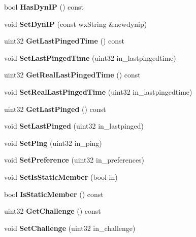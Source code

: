\begin{DoxyCompactItemize}
\item 
bool {\bfseries HasDynIP} () const \label{classCServer_a6b8d253822dd10ac34843a93030889fd}

\item 
void {\bfseries SetDynIP} (const wxString \&newdynip)\label{classCServer_ae05c6453354d0c1fec58bd96cefef867}

\item 
uint32 {\bfseries GetLastPingedTime} () const \label{classCServer_a6e4961fb0a54c8f3671c135997741e3a}

\item 
void {\bfseries SetLastPingedTime} (uint32 in\_\-lastpingedtime)\label{classCServer_a81ab8ff4d5c73e63e2db7dcf61e68a70}

\item 
uint32 {\bfseries GetRealLastPingedTime} () const \label{classCServer_aa6e37ebd66c70e1e1ca835c7ce4ab44c}

\item 
void {\bfseries SetRealLastPingedTime} (uint32 in\_\-lastpingedtime)\label{classCServer_a7f3e695424443a83d3325de6c2c43d2d}

\item 
uint32 {\bfseries GetLastPinged} () const \label{classCServer_aef4187e834eab2bc644dc161673003de}

\item 
void {\bfseries SetLastPinged} (uint32 in\_\-lastpinged)\label{classCServer_a545b36f98670081409b0e1178ed2f423}

\item 
void {\bfseries SetPing} (uint32 in\_\-ping)\label{classCServer_ac5214ccc8284d00eacae33cc45e43386}

\item 
void {\bfseries SetPreference} (uint32 in\_\-preferences)\label{classCServer_a2008d9552fe630bdcfe3fea0b6a0586d}

\item 
void {\bfseries SetIsStaticMember} (bool in)\label{classCServer_a09c7bdc411c85e8a5302ad4c150a6930}

\item 
bool {\bfseries IsStaticMember} () const \label{classCServer_a5c4d1a3c4d1d3e0fe798dfbf89842d6d}

\item 
uint32 {\bfseries GetChallenge} () const \label{classCServer_af65b18932f5fed1d3588c51b40b3f039}

\item 
void {\bfseries SetChallenge} (uint32 in\_\-challenge)\label{classCServer_a74c52f064d6dbf7251598a4f1845f313}


\end{DoxyCompactItemize}

